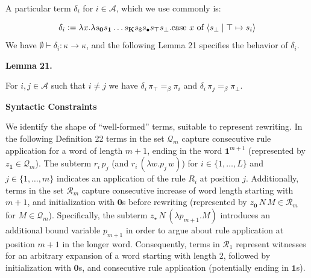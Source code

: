 \documentclass[10pt,a4paper]{amsart}
\begin{document}
 
A particular term $\delta_{i}$ for $i\in\mathcal{A}$, which we use commonly is:\par
    \[\delta_{i}:=\lambda x.\lambda s_{\mathbf{0}}s_{\mathbf{1}}\ldots s_{\mathbf{K}%
}s_{\$}s_{\bullet}s_{\top}s_{\bot}.\textnormal{{case }}{x}\textnormal{{ of }}%
\langle s_{\bot}\mid\top\mapsto s_{i}\rangle\]    
We have $\emptyset\vdash\delta_{i}:\kappa\to\kappa$, and the following Lemma 21 specifies the behavior of $\delta_{i}$.\par
 
 
 
\par\medskip\noindent\textbf{Lemma 21.}\par
 
 
For $i,j\in\mathcal{A}$ such that $i\neq j$ we have $\delta_{i}\,\pi_{\top}=_{\beta}\pi_{i}$ and $\delta_{i}\,\pi_{j}=_{\beta}\pi_{\bot}$.\par
 
 
 
 
 
\par\medskip\noindent\textbf{Syntactic Constraints}\par
 
 
We identify the shape of “well-formed” terms, suitable to represent rewriting. In the following Definition 22 terms in the set $\mathcal{Q}_{m}$ capture consecutive rule application for a word of length $m+1$, ending in the word $\mathbf{1}^{m+1}$ (represented by $z_{\mathbf{1}}\in\mathcal{Q}_{m}$). The subterm $r_{i}\,p_{j}$ (and $r_{i}\,(\lambda w.p_{j}\,w)$) for $i\in\{1,\ldots,L\}$ and $j\in\{1,\ldots,m\}$ indicates an application of the rule $R_{i}$ at position $j$. Additionally, terms in the set $\mathcal{R}_{m}$ capture consecutive increase of word length starting with $m+1$, and initialization with $\mathbf{0}$s before rewriting (represented by $z_{\mathbf{0}}\,N\,M\in\mathcal{R}_{m}$ for $M\in\mathcal{Q}_{m}$). Specifically, the subterm $z_{\star}\,N\,(\lambda p_{m+1}.M)$ introduces an additional bound variable $p_{m+1}$ in order to argue about rule application at position $m+1$ in the longer word. Consequently, terms in $\mathcal{R}_{1}$ represent witnesses for an arbitrary expansion of a word starting with length $2$, followed by initialization with $\mathbf{0}$s, and consecutive rule application (potentially ending in $\mathbf{1}$s).\par
 
\end{document}
